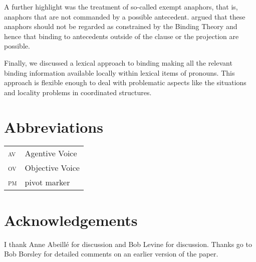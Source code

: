 \documentclass[output=paper
	        ,collection
	        ,collectionchapter
 	        ,biblatex
                ,babelshorthands
                ,newtxmath
                ,draftmode
                ,colorlinks, citecolor=brown
]{langscibook}
\begin{document}
A further highlight was the treatment of so-called exempt anaphors, that is, anaphors that are not
commanded by a possible antecedent. \citet{PS92a} argued that these anaphors should not be regarded
as constrained by the Binding Theory and hence that binding to antecedents outside of the clause or
the projection are possible.

Finally, we discussed a lexical approach to binding making all the relevant binding information
available locally within lexical items of pronouns. This approach is flexible enough to deal with
problematic aspects like the \iwithini situations and locality problems in coordinated structures.

\section*{Abbreviations}

\begin{tabularx}{.99\textwidth}{@{}lX}
\textsc{av} & Agentive Voice\\
\textsc{ov} & Objective Voice\\
\textsc{pm} & pivot marker\\
\end{tabularx}




\section*{Acknowledgements}


I thank Anne Abeillé for discussion and Bob Levine for discussion.
Thanks go to Bob Borsley for detailed comments on an earlier version of the paper.


{\sloppy
\printbibliography[heading=subbibliography,notkeyword=this]
}
\end{document}
